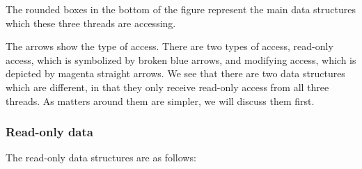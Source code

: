 \documentclass[fontsize=12,a4paper]{scrartcl}
\begin{document}
The rounded boxes in the bottom of the figure represent the main data
structures which these three threads are accessing.

The arrows show the type of access. There are two types of access,
read-only access, which is symbolized by broken blue arrows, and
modifying access, which is depicted by magenta straight arrows. We see
that there are two data structures which are different, in that they
only receive read-only access from all three threads. As matters
around them are simpler, we will discuss them first.

\subsubsection{Read-only data}

The read-only data structures are as follows:
\end{document}
